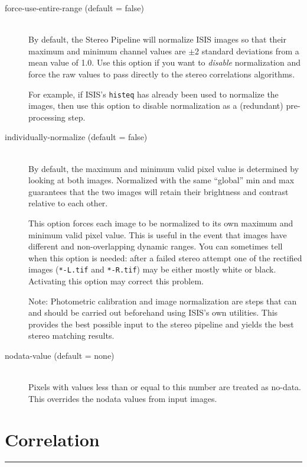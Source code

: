 \begin{description}
\item[force-use-entire-range \textnormal (default = false)] \hfill \\
  By default, the Stereo Pipeline will normalize ISIS images so that
  their maximum and minimum channel values are $\pm$2 standard
  deviations from a mean value of 1.0.  Use this option if you want to
  {\em disable} normalization and force the raw
  values to pass directly to the stereo correlations algorithms.

  For example, if ISIS's \texttt{histeq} has already been used to
  normalize the images, then use this option to disable normalization
  as a (redundant) pre-processing step.


\item[individually-normalize \textnormal (default = false)] \hfill \\
  By default, the maximum and minimum valid pixel value is determined
  by looking at both images.  Normalized with the same ``global'' min
  and max guarantees that the two images will retain their brightness
  and contrast relative to each other.

  This option forces each image to be normalized to its own maximum
  and minimum valid pixel value. This is useful in the event that
  images have different and non-overlapping dynamic ranges. You can
  sometimes tell when this option is needed: after a failed stereo
  attempt one of the rectified images (\texttt{*-L.tif} and
  \texttt{*-R.tif}) may be either mostly white or black.  Activating
  this option may correct this problem.

  Note: Photometric calibration and image normalization are steps that
  can and should be carried out beforehand using ISIS's own utilities.
  This provides the best possible input to the stereo pipeline and
  yields the best stereo matching results.

\item[nodata-value \textnormal (default = none)] \hfill \\
  Pixels with values less than or equal to this number are treated as
  no-data. This overrides the nodata values from input images.

\end{description}

\section{Correlation}
\label{corr_section}
\hrule
\bigskip

